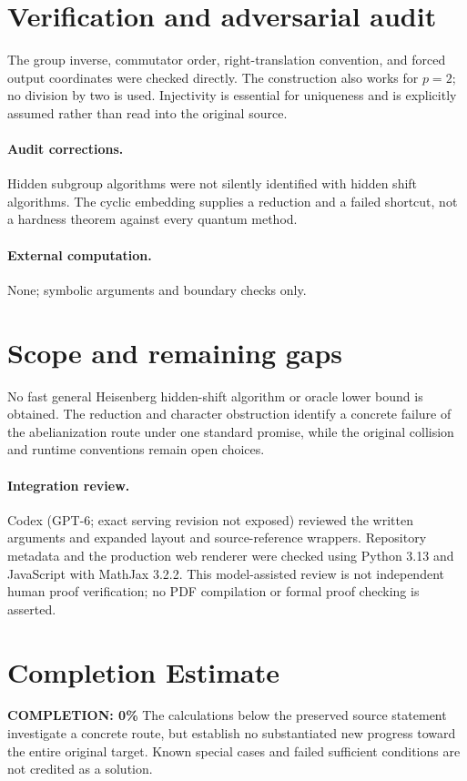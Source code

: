 \documentclass[11pt]{article}
\begin{document}
\section{Verification and adversarial audit}
The group inverse, commutator order, right-translation convention, and forced output coordinates were checked directly. The construction also works for $p=2$; no division by two is used. Injectivity is essential for uniqueness and is explicitly assumed rather than read into the original source.
\paragraph{Audit corrections.} Hidden subgroup algorithms were not silently identified with hidden shift algorithms. The cyclic embedding supplies a reduction and a failed shortcut, not a hardness theorem against every quantum method.
\paragraph{External computation.} None; symbolic arguments and boundary checks only.
\section{Scope and remaining gaps}
No fast general Heisenberg hidden-shift algorithm or oracle lower bound is obtained. The reduction and character obstruction identify a concrete failure of the abelianization route under one standard promise, while the original collision and runtime conventions remain open choices.
\paragraph{Integration review.} Codex (GPT-6; exact serving revision not exposed) reviewed the written arguments and expanded layout and source-reference wrappers. Repository metadata and the production web renderer were checked using Python 3.13 and JavaScript with MathJax 3.2.2. This model-assisted review is not independent human proof verification; no PDF compilation or formal proof checking is asserted.

\section{Completion Estimate}
\noindent\textbf{COMPLETION: 0\%}
The calculations below the preserved source statement investigate a concrete route,
but establish no substantiated new progress toward the entire original target.
Known special cases and failed sufficient conditions are not credited as a solution.
\end{document}
